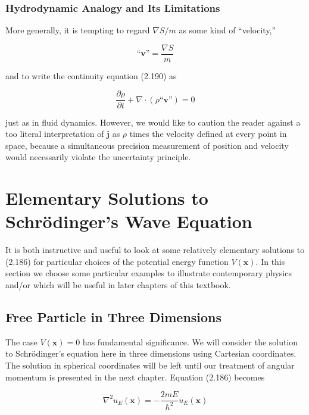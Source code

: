 \documentclass[11pt,a4paper]{article}
\begin{document}
\subsubsection{Hydrodynamic Analogy and Its Limitations}

More generally, it is tempting to regard $\nabla S/m$ as some kind of ``velocity,''

\begin{equation}
\text{``}\mathbf{v}\text{''} = \frac{\nabla S}{m}
\tag{2.198}
\end{equation}

and to write the continuity equation (2.190) as

\begin{equation}
\frac{\partial \rho}{\partial t} + \nabla \cdot (\rho\text{``}\mathbf{v}\text{''}) = 0
\tag{2.199}
\end{equation}

just as in fluid dynamics. However, we would like to caution the reader against a too literal interpretation of $\mathbf{j}$ as $\rho$ times the velocity defined at every point in space, because a simultaneous precision measurement of position and velocity would necessarily violate the uncertainty principle.

\newpage
\section{Elementary Solutions to Schrödinger's Wave Equation}

It is both instructive and useful to look at some relatively elementary solutions to (2.186) for particular choices of the potential energy function $V(\mathbf{x})$. In this section we choose some particular examples to illustrate contemporary physics and/or which will be useful in later chapters of this textbook.

\subsection{Free Particle in Three Dimensions}

The case $V(\mathbf{x}) = 0$ has fundamental significance. We will consider the solution to Schrödinger's equation here in three dimensions using Cartesian coordinates. The solution in spherical coordinates will be left until our treatment of angular momentum is presented in the next chapter. Equation (2.186) becomes

\begin{equation}
\nabla^2 u_E(\mathbf{x}) = -\frac{2mE}{\hbar^2}u_E(\mathbf{x})
\tag{2.205}
\end{equation}
\end{document}
